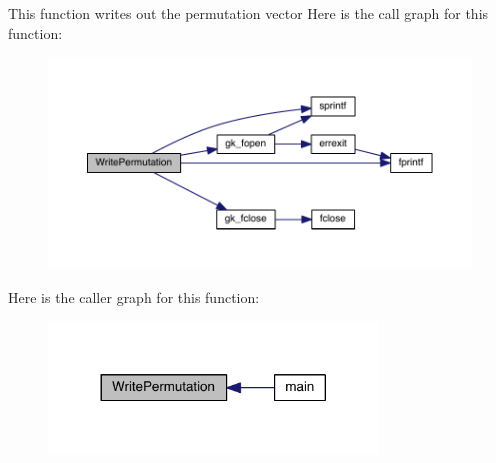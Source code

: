 This function writes out the permutation vector Here is the call graph for this function\+:\nopagebreak
\begin{figure}[H]
\begin{center}
\leavevmode
\includegraphics[width=350pt]{a00948_a1c37c9f8d06b4dea85ac0ab2abe762eb_cgraph}
\end{center}
\end{figure}
Here is the caller graph for this function\+:\nopagebreak
\begin{figure}[H]
\begin{center}
\leavevmode
\includegraphics[width=248pt]{a00948_a1c37c9f8d06b4dea85ac0ab2abe762eb_icgraph}
\end{center}
\end{figure}
